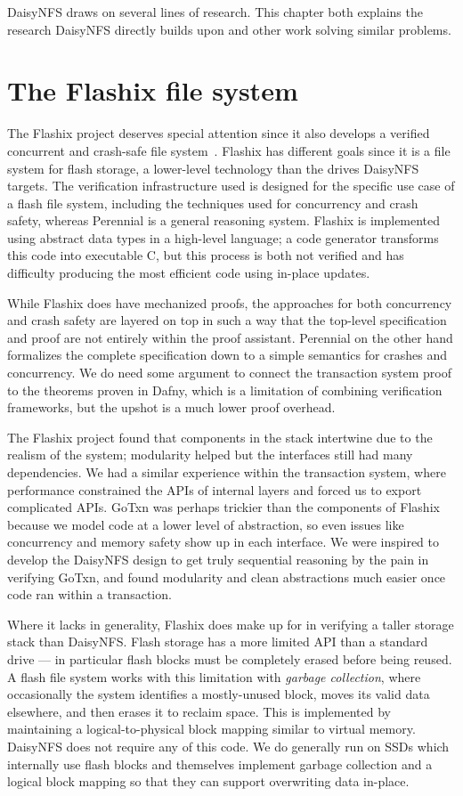 DaisyNFS draws on several lines of research. This chapter both explains the
research DaisyNFS directly builds upon and other work solving similar problems.

\section{The Flashix file system}

The Flashix project deserves special attention since it also develops a verified
concurrent and crash-safe file system~\cite{bodenmuller:concurrent-flashix}.
Flashix has different goals since it is a file system for flash storage, a
lower-level technology than the drives DaisyNFS targets. The verification
infrastructure used is designed for the specific use case of a flash file
system, including the techniques used for concurrency and crash safety, whereas
Perennial is a general reasoning system. Flashix is implemented using abstract
data types in a high-level language; a code generator transforms this code into
executable C, but this process is both not verified and has difficulty producing
the most efficient code using in-place updates.

While Flashix does have mechanized proofs, the approaches for both concurrency
and crash safety are layered on top in such a way that the top-level
specification and proof are not entirely within the proof assistant. Perennial
on the other hand formalizes the complete specification down to a simple
semantics for crashes and concurrency. We do need some argument to connect the
transaction system proof to the theorems proven in Dafny, which is a limitation
of combining verification frameworks, but the upshot is a much lower proof
overhead.

The Flashix project found that components in the stack intertwine due to the
realism of the system; modularity helped but the interfaces still had many
dependencies. We had a similar experience within the transaction system, where
performance constrained the APIs of internal layers and forced us to export
complicated APIs. GoTxn was perhaps trickier than the components of Flashix
because we model code at a lower level of abstraction, so even issues like
concurrency and memory safety show up in each interface. We were inspired to
develop the DaisyNFS design to get truly sequential reasoning by the pain in
verifying GoTxn, and found modularity and clean abstractions much easier once
code ran within a transaction.

Where it lacks in generality, Flashix does make up for in verifying a taller
storage stack than DaisyNFS. Flash storage has a more limited API than a
standard drive --- in particular flash blocks must be completely erased before
being reused. A flash file system works with this limitation with \emph{garbage
collection}, where occasionally the system identifies a mostly-unused block,
moves its valid data elsewhere, and then erases it to reclaim space. This is
implemented by maintaining a logical-to-physical block mapping similar to
virtual memory. DaisyNFS does not require any of this code. We do generally run
on SSDs which internally use flash blocks and themselves implement garbage
collection and a logical block mapping so that they can support overwriting data
in-place.

